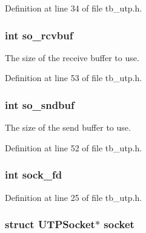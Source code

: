 Definition at line 34 of file tb\-\_\-utp.\-h.

\hypertarget{structtb__utp__t_a739481faef9852a57d912b2a31b5a8fc}{
\subsubsection[{so\-\_\-rcvbuf}]{\setlength{\rightskip}{0pt plus 5cm}int so\-\_\-rcvbuf}}\label{structtb__utp__t_a739481faef9852a57d912b2a31b5a8fc}


The size of the receive buffer to use. 



Definition at line 53 of file tb\-\_\-utp.\-h.

\hypertarget{structtb__utp__t_aae962af134e15f29f1dd0b005fc3ff2c}{
\subsubsection[{so\-\_\-sndbuf}]{\setlength{\rightskip}{0pt plus 5cm}int so\-\_\-sndbuf}}\label{structtb__utp__t_aae962af134e15f29f1dd0b005fc3ff2c}


The size of the send buffer to use. 



Definition at line 52 of file tb\-\_\-utp.\-h.

\hypertarget{structtb__utp__t_a514331e6141a28289f8ddead55eadebd}{
\subsubsection[{sock\-\_\-fd}]{\setlength{\rightskip}{0pt plus 5cm}int sock\-\_\-fd}}\label{structtb__utp__t_a514331e6141a28289f8ddead55eadebd}


Definition at line 25 of file tb\-\_\-utp.\-h.

\hypertarget{structtb__utp__t_add15e39a83c7a0c72140c305bdd386d0}{
\subsubsection[{socket}]{\setlength{\rightskip}{0pt plus 5cm}struct U\-T\-P\-Socket$\ast$ socket}}\label{structtb__utp__t_add15e39a83c7a0c72140c305bdd386d0}


